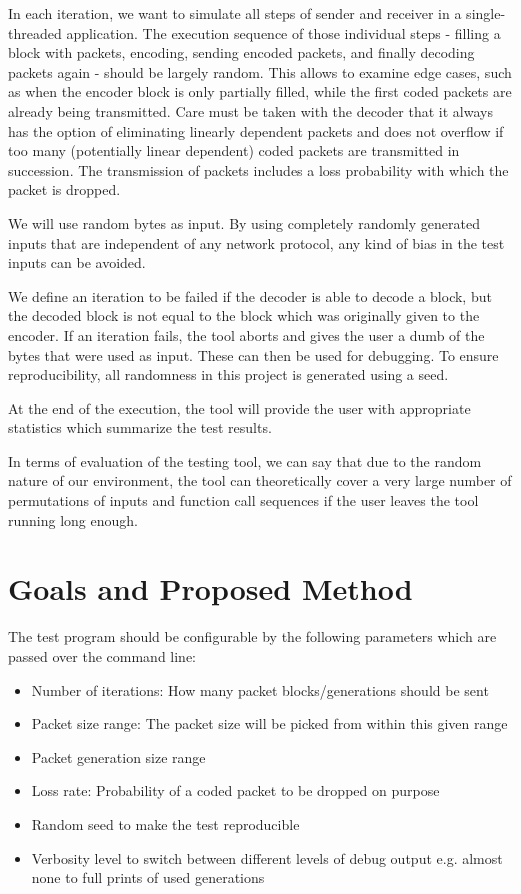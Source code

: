 \documentclass[a4paper,english,10pt]{tumarticle}
\begin{document}
In each iteration, we want to simulate all steps of sender and receiver in a single-threaded
application. The execution sequence of those individual steps - filling a block with packets,
encoding, sending encoded packets, and finally decoding packets again - should be largely random.
This allows to examine edge cases, such as when the encoder block is only partially filled, while
the first coded packets are already being transmitted. Care must be taken with the decoder that it
always has the option of eliminating linearly dependent packets and does not overflow if too many
(potentially linear dependent) coded packets are transmitted in succession. The transmission of
packets includes a loss probability with which the packet is dropped.

We will use random bytes as input. By using completely randomly generated inputs that are
independent of any network protocol, any kind of bias in the test inputs can be avoided.

We define an iteration to be failed if the decoder is able to decode a block, but the decoded block
is not equal to the block which was originally given to the encoder. If an iteration fails, the tool
aborts and gives the user a dumb of the bytes that were used as input. These can then be used for
debugging. To ensure reproducibility, all randomness in this project is generated using a seed.

At the end of the execution, the tool will provide the user with appropriate statistics which
summarize the test results. 

In terms of evaluation of the testing tool, we can say that due to the random nature of our
environment, the tool can theoretically cover a very large number of permutations of inputs and
function call sequences if the user leaves the tool running long enough.


\section{Goals and Proposed Method}\label{sec:milestones}

The test program should be configurable by the following parameters which are passed over the
command line:
\begin{itemize}
    \setlength{\itemsep}{1pt}
	\setlength{\parskip}{0pt}
	\setlength{\parsep}{0pt}
    \item Number of iterations: How many packet blocks/generations should be sent
    \item Packet size range: The packet size will be picked from within this given range
    \item Packet generation size range
    \item Loss rate: Probability of a coded packet to be dropped on purpose
    \item Random seed to make the test reproducible
    \item Verbosity level to switch between different levels of debug output e.g. almost none to
    full prints of used generations
\end{itemize}
\end{document}
